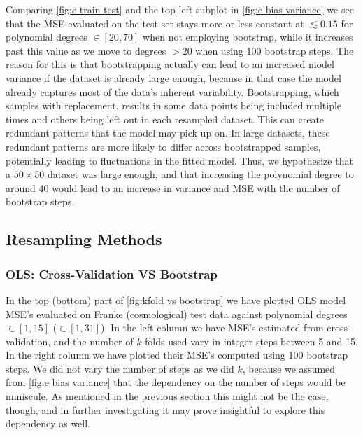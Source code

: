 \documentclass[aps,pra,english,notitlepage,reprint,nofootinbib]{revtex4-1}  %
\begin{document}
Comparing \cref{fig:e train test} and the top left subplot in \cref{fig:e bias variance} we see that the MSE evaluated on the test set stays more or less constant at $\lesssim0.15$ for polynomial degrees $\in[20,70]$ when not employing bootstrap, while it increases past this value as we move to degrees $>20$ when using 100 bootstrap steps. The reason for this is that bootstrapping actually can lead to an increased model variance if the dataset is already large enough, because in that case the model already captures most of the data's inherent variability. Bootstrapping, which samples with replacement, results in some data points being included multiple times and others being left out in each resampled dataset. This can create redundant patterns that the model may pick up on. In large datasets, these redundant patterns are more likely to differ across bootstrapped samples, potentially leading to fluctuations in the fitted model. Thus, we hypothesize that a $50\times50$ dataset was large enough, and that increasing the polynomial degree to around 40 would lead to an increase in variance and MSE with the number of bootstrap steps.


\subsection{Resampling Methods}
\subsubsection{OLS: Cross-Validation VS Bootstrap}
In the top (bottom) part of \cref{fig:kfold vs bootstrap} we have plotted OLS model MSE's evaluated on Franke (cosmological) test data against polynomial degrees $\in[1,15]$ ($\in[1,31]$). In the left column we have MSE's estimated from cross-validation, and the number of $k$-folds used vary in integer steps between 5 and 15. In the right column we have plotted their MSE's computed using 100 bootstrap steps. We did not vary the number of steps as we did $k$, because we assumed from \cref{fig:e bias variance} that the dependency on the number of steps would be miniscule. As mentioned in the previous section this might not be the case, though, and in further investigating it may prove insightful to explore this dependency as well.
\end{document}
